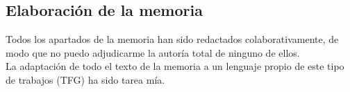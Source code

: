 \subsection{Elaboración de la memoria}
Todos los apartados de la memoria han sido redactados colaborativamente, 
de modo que no puedo adjudicarme la autoría total de ninguno de ellos.\\
La adaptación de todo el texto de la memoria a un lenguaje propio de 
este tipo de trabajos (TFG) ha sido tarea mía.
